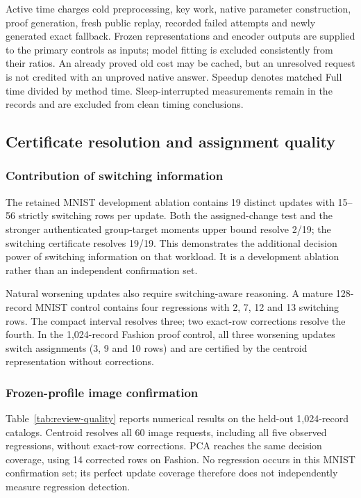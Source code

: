 Active time charges cold preprocessing, key work, native parameter
construction, proof generation, fresh public replay, recorded failed
attempts and newly generated exact fallback. Frozen representations and
encoder outputs are supplied to the primary controls as inputs; model
fitting is excluded consistently from their ratios. An already proved old
cost may be cached, but an unresolved request is not credited with an
unproved native answer. Speedup denotes matched Full time divided by method
time. Sleep-interrupted measurements remain in the records and are excluded
from clean timing conclusions.

\subsection{Certificate resolution and assignment quality}
\subsubsection{Contribution of switching information}
The retained MNIST development ablation contains 19 distinct updates with
15--56 strictly switching rows per update. Both the assigned-change test
and the stronger authenticated group-target moments upper bound resolve
2/19; the switching certificate resolves 19/19. This demonstrates the
additional decision power of switching information on that workload.
It is a development ablation rather than an independent confirmation set.

Natural worsening updates also require switching-aware reasoning. A mature
128-record MNIST control contains four regressions with 2, 7, 12 and 13
switching rows. The compact interval resolves three; two exact-row
corrections resolve the fourth. In the 1,024-record Fashion proof control,
all three worsening updates switch assignments (3, 9 and 10 rows) and are
certified by the centroid representation without corrections.

\subsubsection{Frozen-profile image confirmation}
Table~\ref{tab:review-quality} reports numerical results on the held-out
1,024-record catalogs. Centroid resolves all 60 image requests, including
all five observed regressions, without exact-row corrections. PCA reaches
the same decision coverage, using 14 corrected rows on Fashion. No
regression occurs in this MNIST confirmation set; its perfect update
coverage therefore does not independently measure regression detection.

